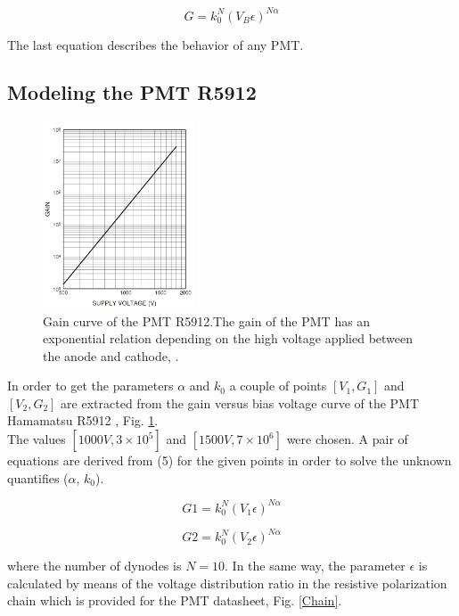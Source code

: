 \documentclass[letterpaper, 10 pt, conference]{ieeeconf}  %
\begin{document}
\begin{equation}
G = k_0^N (V_B \epsilon)^{N\alpha} 
\end{equation}

The last equation describes the behavior of any PMT.

\subsection{Modeling the PMT R5912}


\begin{figure}[h!]
\begin{center}
\includegraphics[width=0.4\textwidth]{Figures/Gain_curve}
\caption{Gain curve of the PMT R5912.The gain of the PMT has an exponential relation depending on the high voltage applied between the anode and cathode, \cite{r5912}.}
\label{Gain_curve}
\end{center}
\end{figure}

In order to get the parameters $\alpha$ and $k_0$ a couple of points $[V_1, G_1]$ and $[V_2, G_2]$ are extracted from the gain versus bias voltage curve of the PMT Hamamatsu R5912 , Fig. \ref{Gain_curve}.\\

The values $[1000 V, 3 \times 10^5 ]$ and $[1500 V, 7 \times 10^6]$ were chosen. A pair of equations are derived from (5) for the given points in order to solve the unknown quantifies ($\alpha$, $k_0$).

\begin{equation}
G1 = k_0^N (V_1 \epsilon)^{N \alpha}
\end{equation}

\begin{equation}
G2 = k_0^N (V_2 \epsilon)^{N \alpha}
\end{equation}

where the number of dynodes is $N=10$. In the same way, the parameter $\epsilon$ is calculated by means of the voltage distribution ratio in the resistive polarization chain which is provided for the PMT datasheet, Fig. \ref{Chain}.
\end{document}
